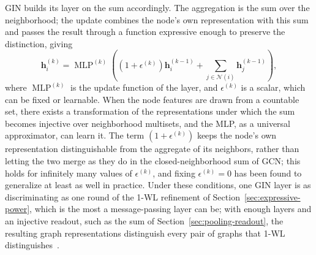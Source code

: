 GIN builds its layer on the sum accordingly. The aggregation is the sum over the
neighborhood; the update combines the node's own representation with this sum and
passes the result through a function expressive enough to preserve the
distinction, giving
\begin{equation}
  \mathbf{h}_i^{(k)}
    = \operatorname{MLP}^{(k)}\!\left(
        \left( 1 + \epsilon^{(k)} \right) \mathbf{h}_i^{(k-1)}
        + \sum_{j \in \mathcal{N}(i)} \mathbf{h}_j^{(k-1)}
      \right),
  \label{eq:gin}
\end{equation}
where $\operatorname{MLP}^{(k)}$ is the update function of
the layer, and $\epsilon^{(k)}$ is a scalar, which can be fixed or learnable. 
When the node features are drawn from a countable set, there exists a
transformation of the representations under which the sum becomes injective
over neighborhood multisets, and the MLP, as a universal approximator, can learn
it. The term $(1 + \epsilon^{(k)})$ keeps the node's own
representation distinguishable from the aggregate of its neighbors, rather than
letting the two merge as they do in the closed-neighborhood sum of GCN; this
holds for infinitely many values of $\epsilon^{(k)}$, and fixing
$\epsilon^{(k)} = 0$ has been found to generalize at least as well in
practice. Under these conditions, one GIN layer is as
discriminating as one round of the \mbox{1-WL} refinement of
Section~\ref{sec:expressive-power}, which is the most a message-passing layer
can be; with enough layers and an injective readout, such as the sum of
Section~\ref{sec:pooling-readout}, the resulting graph representations
distinguish every pair of graphs that \mbox{1-WL} distinguishes~\cite[-4pc]{xu2019}.